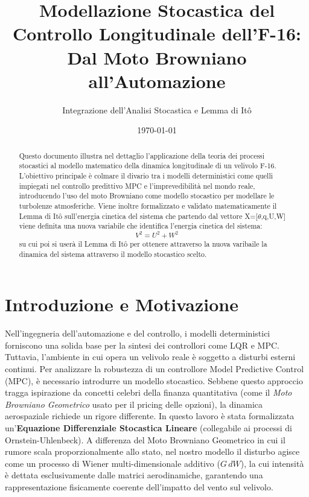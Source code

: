 \documentclass[12pt,a4paper]{article}
\title{\textbf{Modellazione Stocastica del Controllo Longitudinale dell'F-16: \\Dal Moto Browniano all'Automazione}}
\author{Integrazione dell'Analisi Stocastica e Lemma di Itô}
\date{\today}
\begin{document}
\maketitle

\begin{abstract}
Questo documento illustra nel dettaglio l'applicazione della teoria dei processi stocastici al modello matematico della dinamica longitudinale di un velivolo F-16. L'obiettivo principale è colmare il divario tra i modelli deterministici come quelli impiegati nel controllo predittivo MPC e l'imprevedibilità nel mondo reale, introducendo l'uso del moto Browniano come modello stocastico per modellare le turbolenze atmosferiche. Viene inoltre formalizzato e validato matematicamente il Lemma di Itô sull'energia cinetica del sistema che partendo dal vettore X=[$\theta$,q,U,W] viene definita una nuova variabile che identifica l'energia cinetica del sistema:
\begin{equation}
	V^2 = U^2 + W^2
	\label{eq:velocita_totale}
\end{equation}
su cui poi si userà il  Lemma di Itô per ottenere attraverso la nuova varibaile la dinamica del sistema attraverso il modello stocastico scelto.
\end{abstract}

\section{Introduzione e Motivazione}
Nell'ingegneria dell'automazione e del controllo, i modelli deterministici forniscono una solida base per la sintesi dei controllori come LQR e MPC. Tuttavia, l'ambiente in cui opera un velivolo reale è soggetto a disturbi esterni continui. Per analizzare la robustezza di un controllore Model Predictive Control (MPC), è necessario introdurre un modello stocastico. Sebbene questo approccio tragga ispirazione da concetti celebri della finanza quantitativa (come il \textit{Moto Browniano Geometrico} usato per il pricing delle opzioni), la dinamica aerospaziale richiede un rigore differente. In questo lavoro è stata formalizzata un'\textbf{Equazione Differenziale Stocastica Lineare} (collegabile ai processi di Ornstein-Uhlenbeck). A differenza del Moto Browniano Geometrico in cui il rumore scala proporzionalmente allo stato, nel nostro modello il disturbo agisce come un processo di Wiener multi-dimensionale additivo ($G \, dW$), la cui intensità è dettata esclusivamente dalle matrici aerodinamiche, garantendo una rappresentazione fisicamente coerente dell'impatto del vento sul velivolo.
\clearpage
\end{document}

